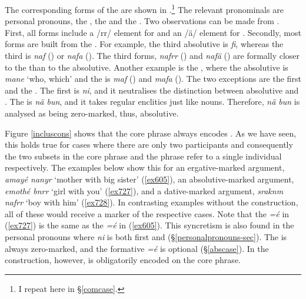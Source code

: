 The corresponding  forms of the   are shown in .\footnote{I repeat here  in \S\ref{comcase}.} The relevant pronominals are personal pronouns, the  , the   and the . Two observations can be made from . First, all forms include a /rr/ element for  and an /ä/ element for . Secondly, most forms are built from the  . For example, the third  absolutive is \emph{fi}, whereas the third   is \emph{naf} (\Sg) or \emph{nafa} (\Nsg). The  third  forms, \emph{nafrr} (\Du) and \emph{nafä} (\Pl) are formally closer to the  than to the absolutive. Another example is the , where the absolutive is \emph{mane} `who, which' and the  is \emph{maf} (\Sg) and \emph{mafa} (\Nsg). The two exceptions are the first  and the  . The first   is \emph{ni}, and it neutralises the distinction between absolutive and . The   is \emph{nä bun}, and it takes regular  enclitics just like nouns. Therefore, \emph{nä bun} is analysed as being zero-marked, thus, absolutive.

Figure \ref{incluscons} shows that the core phrase always encodes  . As we have seen, this holds true for cases where there are only two participants and consequently the two subsets in the core phrase and the  phrase refer to a single individual respectively. The examples below show this for an ergative-marked argument, \emph{amayé nanyr} `mother with big sister' (\ref{ex605}), an absolutive-marked argument, \emph{emothé bnrr} `girl with you' (\ref{ex727}), and a dative-marked argument, \emph{sraknm nafrr} `boy with him' (\ref{ex728}). In contrasting examples without the  construction, all of these would receive a  marker of the respective cases. Note that the   \emph{=é} in (\ref{ex727}) is the same as the   \emph{=é} in (\ref{ex605}). This syncretism is also found in the personal pronouns where \emph{ni} is both first    and  ({\S}\ref{personalpronouns-sec}). The   is always zero-marked, and the  formative \emph{=é} is optional ({\S}\ref{abscase}). In the  construction, however,   is obligatorily encoded on the core phrase.

